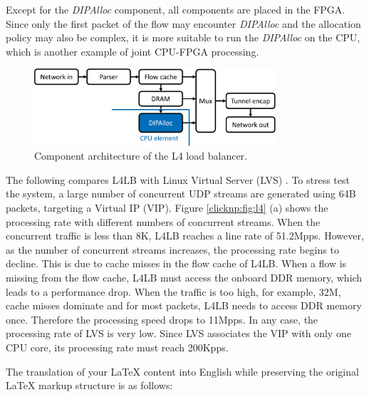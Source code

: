Except for the \textit{DIPAlloc} component, all components are placed in the FPGA. Since only the first packet of the flow may encounter \textit{DIPAlloc} and the allocation policy may also be complex, it is more suitable to run the \textit{DIPAlloc} on the CPU, which is another example of joint CPU-FPGA processing.

\begin{figure}[htbp]
	\centering
	\includegraphics[width=0.8\textwidth]{image/L4LoadBalancer}
	\caption{Component architecture of the L4 load balancer.}
	\label{clicknp:fig:L4LB}
\end{figure}

The following compares L4LB with Linux Virtual Server (LVS) \cite {lvs}.
To stress test the system, a large number of concurrent UDP streams are generated using 64B packets, targeting a Virtual IP (VIP).
Figure \ref {clicknp:fig:l4} (a) shows the processing rate with different numbers of concurrent streams.
When the concurrent traffic is less than 8K, L4LB reaches a line rate of 51.2Mpps.
However, as the number of concurrent streams increases, the processing rate begins to decline.
This is due to cache misses in the flow cache of L4LB.
When a flow is missing from the flow cache, L4LB must access the onboard DDR memory,
which leads to a performance drop.
When the traffic is too high, for example, 32M, cache misses dominate and for most packets,
L4LB needs to access DDR memory once. Therefore the processing speed drops to 11Mpps.
In any case, the processing rate of LVS is very low.
Since LVS associates the VIP with only one CPU core, its processing rate must reach 200Kpps.

The translation of your LaTeX content into English while preserving the original LaTeX markup structure is as follows:

